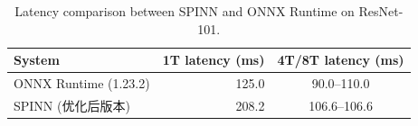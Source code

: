 \begin{table}[htbp]
\centering
\caption{Latency comparison between SPINN and ONNX Runtime on ResNet-101.}
\label{tab:spinn_ort_comparison}
\begin{tabular}{l r c}
\toprule
System & 1T latency (ms) & 4T/8T latency (ms) \\
\midrule
ONNX Runtime (1.23.2) & 125.0 & 90.0--110.0 \\
SPINN (优化后版本) & 208.2 & 106.6--106.6 \\
\bottomrule
\end{tabular}
\end{table}
